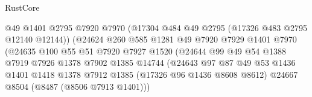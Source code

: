 \begin{lexlean}{RustCore}
\begin{coremodule}
                                          @49
                                          @1401
                                          @2795
                                          @7920
                                          @7970
                                          (@17304 @484 @49 @2795 (@17326 @483 @2795 @12140 @12144))
                                          (@24624
                                            @260
                                            @585
                                            @1281
                                            @49
                                            @7920
                                            @7929
                                            @1401
                                            @7970
                                            (@24635
                                              @100
                                              @55
                                              @51
                                              @7920
                                              @7927
                                              @1520
                                              (@24644
                                                @99
                                                @49
                                                @54
                                                @1388
                                                @7919
                                                @7926
                                                @1378
                                                @7902
                                                @1385
                                                @14744
                                                (@24643
                                                  @97
                                                  @87
                                                  @49
                                                  @53
                                                  @1436
                                                  @1401
                                                  @1418
                                                  @1378
                                                  @7912
                                                  @1385
                                                  (@17326 @96 @1436 @8608 @8612)
                                                  @24667
                                                  @8504
                                                  (@8487 (@8506 @7913 @1401)))

\end{coremodule}
\end{lexlean}
